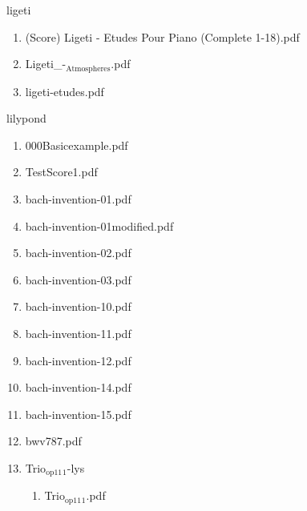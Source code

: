 \documentclass[11pt]{article}
\begin{document}
\item ligeti
\label{sec-1-1-1-1-44-40}
\begin{enumerate}
\item (Score) Ligeti - Etudes Pour Piano (Complete 1-18).pdf
\label{sec-1-1-1-1-44-40-1}

\item Ligeti\_-$_{\text{Atmospheres}}$.pdf
\label{sec-1-1-1-1-44-40-2}

\item ligeti-etudes.pdf
\label{sec-1-1-1-1-44-40-3}
\end{enumerate}

\item lilypond
\label{sec-1-1-1-1-44-41}
\begin{enumerate}
\item 000Basicexample.pdf
\label{sec-1-1-1-1-44-41-1}

\item TestScore1.pdf
\label{sec-1-1-1-1-44-41-2}

\item bach-invention-01.pdf
\label{sec-1-1-1-1-44-41-3}

\item bach-invention-01modified.pdf
\label{sec-1-1-1-1-44-41-4}

\item bach-invention-02.pdf
\label{sec-1-1-1-1-44-41-5}

\item bach-invention-03.pdf
\label{sec-1-1-1-1-44-41-6}

\item bach-invention-10.pdf
\label{sec-1-1-1-1-44-41-7}

\item bach-invention-11.pdf
\label{sec-1-1-1-1-44-41-8}

\item bach-invention-12.pdf
\label{sec-1-1-1-1-44-41-9}

\item bach-invention-14.pdf
\label{sec-1-1-1-1-44-41-10}

\item bach-invention-15.pdf
\label{sec-1-1-1-1-44-41-11}

\item bwv787.pdf
\label{sec-1-1-1-1-44-41-12}

\item Trio$_{\text{op11}}$$_{\text{1}}$-lys
\label{sec-1-1-1-1-44-41-13}
\begin{enumerate}
\item Trio$_{\text{op11}}$$_{\text{1}}$.pdf
\label{sec-1-1-1-1-44-41-13-1}
\end{enumerate}
\end{enumerate}
\end{document}
